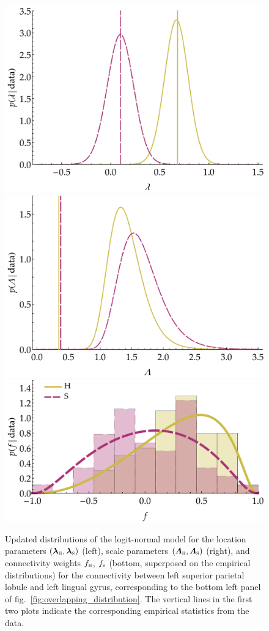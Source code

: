 \documentclass[%
]{frontiersSCNS-nologo} %
\newcommand*{\fig}{fig.} %
\renewcommand*{\|}{\mathpunct{|}}%
\newcommand*{\yhu}{\textsc{h}}
\newcommand*{\yhd}{\textsc{s}}
\newcommand*{\yxx}{f}
\newcommand*{\ylm}{\lambda}
\newcommand*{\ylmm}{\bm{\ylm}}
\newcommand*{\yls}{\varLambda}
\newcommand*{\ylss}{\bm{\yls}}
\begin{document}
\begin{figure}[!t]
  \centering
\includegraphics[width=0.499\linewidth]{updated_meanparempty.pdf}\hfill
\includegraphics[width=0.499\linewidth]{updated_scaleparempty.pdf}\\[\jot]
\includegraphics[width=0.499\linewidth]{updated_postempty.pdf}
\caption{Updated distributions of the logit-normal model for the location
  parameters $(\ylmm_{\yhu},\ylmm_{\yhd})$ (left), scale parameters
  $(\ylss_{\yhu}, \ylss_{\yhd})$ (right), and connectivity weights
  $\yxx_{\yhu}$, $\yxx_{\yhd}$ (bottom, superposed on the empirical
  distributions) for the connectivity between left superior parietal lobule
  and left lingual gyrus, corresponding to the bottom left
  panel of \fig~\ref{fig:overlapping_distribution}. 
  The vertical lines in the first two plots indicate the corresponding
  empirical statistics from the data.}
\label{fig:update_pars}
\end{figure}
\end{document}
